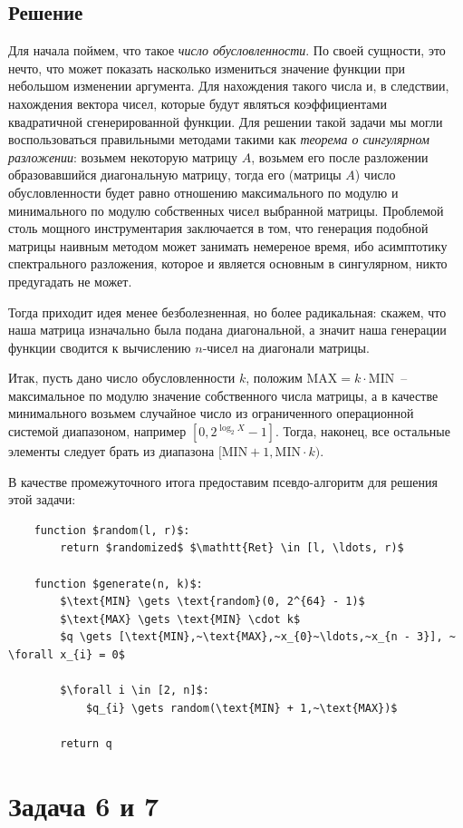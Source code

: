 \documentclass[12pt, a4paper, oneside, final]{article}
\begin{document}
	\subsection*{Решение}
	Для начала поймем, что такое \textit{число обусловленности}. По своей сущности, это нечто, что может показать насколько измениться значение функции при небольшом изменении аргумента. Для нахождения такого числа и, в следствии, нахождения вектора чисел, которые будут являться коэффициентами квадратичной сгенерированной функции. Для решении такой задачи мы могли воспользоваться правильными методами такими как \textit{теорема о сингулярном разложении}: возьмем некоторую матрицу $A$, возьмем его после разложении образовавшийся диагональную матрицу, тогда его (матрицы $A$) число обусловленности будет равно отношению максимального по модулю и минимального по модулю собственных чисел выбранной матрицы. Проблемой столь мощного инструментария заключается в том, что генерация подобной матрицы наивным методом может занимать немереное время, ибо асимптотику спектрального разложения, которое и является основным в сингулярном, никто предугадать не может.

	Тогда приходит идея менее безболезненная, но более радикальная: скажем, что наша матрица изначально была подана диагональной, а значит наша генерации функции сводится к вычислению $n$-чисел на диагонали матрицы.

	Итак, пусть дано число обусловленности $k$, положим $\text{MAX} = k \cdot \text{MIN}$~-- максимальное по модулю значение собственного числа матрицы, а в качестве минимального возьмем случайное число из ограниченного операционной системой диапазоном, например $[0, 2^{\log_{2}{X}} - 1]$. Тогда, наконец, все остальные элементы следует брать из диапазона $[\text{MIN} + 1, \text{MIN} \cdot k)$.

	В качестве промежуточного итога предоставим псевдо-алгоритм для решения этой задачи:
	\begin{lstlisting}
	function $random(l, r)$:
		return $randomized$ $\mathtt{Ret} \in [l, \ldots, r)$
	
	function $generate(n, k)$:
		$\text{MIN} \gets \text{random}(0, 2^{64} - 1)$
		$\text{MAX} \gets \text{MIN} \cdot k$
		$q \gets [\text{MIN},~\text{MAX},~x_{0}~\ldots,~x_{n - 3}], ~ \forall x_{i} = 0$

		$\forall i \in [2, n]$:
			$q_{i} \gets random(\text{MIN} + 1,~\text{MAX})$

		return q
	\end{lstlisting}
	\newpage
	\section*{Задача 6 и 7}
\end{document}
